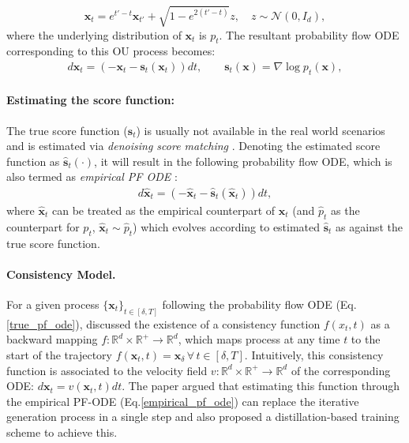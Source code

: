 \documentclass[11pt]{article}
\def\rvx{{\mathbf{x}}}
\def\vs{{\bm{s}}}
\def\vx{{\bm{x}}}
\begin{document}
    \[
        \rvx_t = e^{t'-t} \rvx_{t'} + \sqrt{1-e^{2(t'-t)}} z, \quad
        z \sim \mathcal{N}(0,I_d),
    \]    
where the underlying distribution of $\rvx_t$ is $p_t$.
The resultant probability flow ODE corresponding to this OU process becomes:
\begin{align}
\label{true_pf_ode}
  d \rvx_t = \left(-\rvx_t - \vs_t(\rvx_t)\right)dt ,
  \qquad
  \vs_t(\vx) = \nabla \log p_t(\vx) ,
\end{align}

\paragraph{Estimating the score function:} The true score function ($\vs_t$) is usually not available in the real world scenarios and is estimated
via \textit{denoising score matching} \cite{song2019generative}. Denoting the estimated score function as $\hat{\vs}_t(\cdot)$, it will result in the following probability flow ODE, which is also termed as \textit{empirical PF ODE} \cite{song2023consistency}:
\begin{align}
\label{empirical_pf_ode}
    d \hat{\rvx}_t = \left(-\hat{\rvx}_t - \hat{\vs}_t(\hat{\rvx}_t)\right)dt,
\end{align}
where $\hat{\rvx}_t$ can be treated as the empirical counterpart of $\rvx_t$ (and $\hat{p}_t$ as the counterpart for $p_t$, $\hat{\rvx}_t \sim \hat{p}_t$) which evolves according to estimated $\hat{\vs}_t$ as against the true score function.

\paragraph{Consistency Model.} For a given process $\{\vx_t\}_{t\in [\delta, T]}$ following the probability flow ODE (Eq.\ref{true_pf_ode}), \cite{song2023consistency} discussed the existence of a consistency function $f (x_t, t)$ as a backward mapping $f: \mathbb{R}^d \times \mathbb{R^+} \rightarrow \mathbb{R}^d$, which maps process at any time $t$ to the start of the trajectory $f(\vx_t,t) = \vx_\delta \, \forall \, t\in [\delta, T]$. Intuitively, this consistency function is associated to the velocity field $v: \mathbb{R}^d \times \mathbb{R^+} \rightarrow \mathbb{R}^d $ of the corresponding ODE: $d\vx_t = v(\vx_t,t)dt$.
The paper argued that estimating this function through the empirical PF-ODE (Eq.\ref{empirical_pf_ode}) can replace the iterative generation process in a single step and also proposed a distillation-based training scheme to achieve this.  
\end{document}
